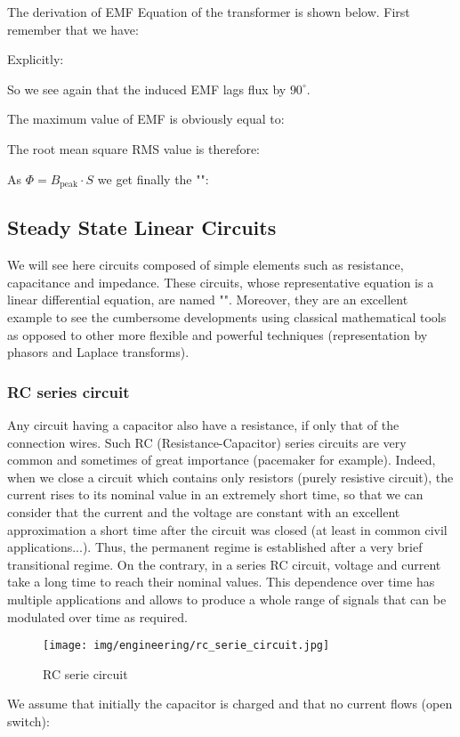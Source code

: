 	The derivation of EMF Equation of the transformer is shown below. First remember that we have:
	
	Explicitly:
	
	So we see again that the induced EMF lags flux by $90^\circ$.

	The maximum value of EMF is obviously equal to:
	
	The root mean square RMS value is therefore:
	
	As $\Phi=B_\text{peak}\cdot S$ we get finally the "":
	
	
	\pagebreak
	\subsection{Steady State Linear Circuits}
	We will see here circuits composed of simple elements such as resistance, capacitance and impedance. These circuits, whose representative equation is a linear differential equation, are named "". Moreover, they are an excellent example to see the cumbersome developments using classical mathematical tools as opposed to other more flexible and powerful techniques (representation by phasors and Laplace transforms).
	
	\subsubsection{RC series circuit}\label{rc series circuit}
	Any circuit having a capacitor also have a resistance, if only that of the connection wires. Such RC (Resistance-Capacitor) series circuits are very common and sometimes of great importance (pacemaker for example). Indeed, when we close a circuit which contains only resistors (purely resistive circuit), the current rises to its nominal value in an extremely short time, so that we can consider that the current and the voltage are constant with an excellent approximation a short time after the circuit was closed (at least in common civil applications...). Thus, the permanent regime is established after a very brief transitional regime. On the contrary, in a series RC circuit, voltage and current take a long time to reach their nominal values. This dependence over time has multiple applications and allows to produce a whole range of signals that can be modulated over time as required.
	\begin{figure}[H]
		\centering
		\texttt{[image: img/engineering/rc\_serie\_circuit.jpg]}
		\caption{RC serie circuit}
	\end{figure}
	We assume that initially the capacitor is charged and that no current flows (open switch):
	

